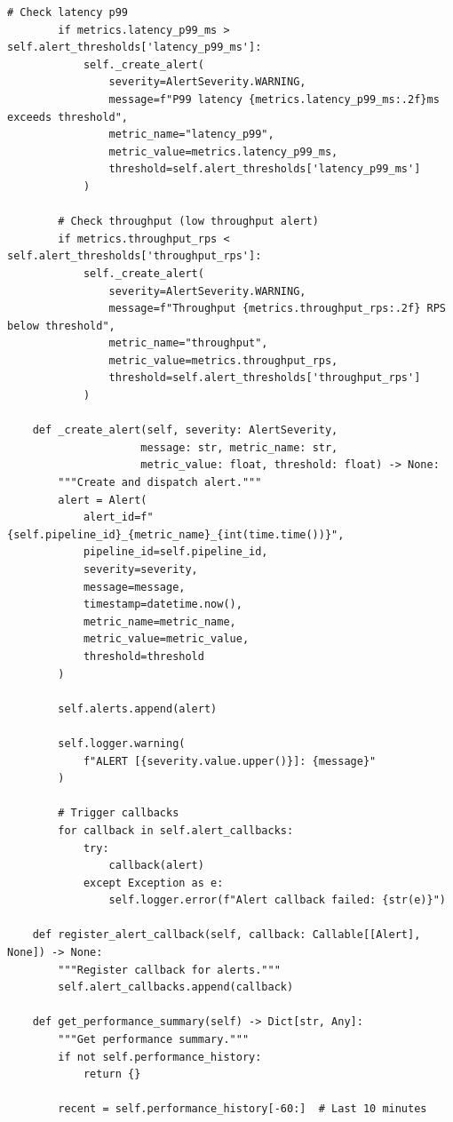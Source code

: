 \begin{lstlisting}[style=python, caption=PipelineMonitor with Performance Tracking]
        # Check latency p99
        if metrics.latency_p99_ms > self.alert_thresholds['latency_p99_ms']:
            self._create_alert(
                severity=AlertSeverity.WARNING,
                message=f"P99 latency {metrics.latency_p99_ms:.2f}ms exceeds threshold",
                metric_name="latency_p99",
                metric_value=metrics.latency_p99_ms,
                threshold=self.alert_thresholds['latency_p99_ms']
            )

        # Check throughput (low throughput alert)
        if metrics.throughput_rps < self.alert_thresholds['throughput_rps']:
            self._create_alert(
                severity=AlertSeverity.WARNING,
                message=f"Throughput {metrics.throughput_rps:.2f} RPS below threshold",
                metric_name="throughput",
                metric_value=metrics.throughput_rps,
                threshold=self.alert_thresholds['throughput_rps']
            )

    def _create_alert(self, severity: AlertSeverity,
                     message: str, metric_name: str,
                     metric_value: float, threshold: float) -> None:
        """Create and dispatch alert."""
        alert = Alert(
            alert_id=f"{self.pipeline_id}_{metric_name}_{int(time.time())}",
            pipeline_id=self.pipeline_id,
            severity=severity,
            message=message,
            timestamp=datetime.now(),
            metric_name=metric_name,
            metric_value=metric_value,
            threshold=threshold
        )

        self.alerts.append(alert)

        self.logger.warning(
            f"ALERT [{severity.value.upper()}]: {message}"
        )

        # Trigger callbacks
        for callback in self.alert_callbacks:
            try:
                callback(alert)
            except Exception as e:
                self.logger.error(f"Alert callback failed: {str(e)}")

    def register_alert_callback(self, callback: Callable[[Alert], None]) -> None:
        """Register callback for alerts."""
        self.alert_callbacks.append(callback)

    def get_performance_summary(self) -> Dict[str, Any]:
        """Get performance summary."""
        if not self.performance_history:
            return {}

        recent = self.performance_history[-60:]  # Last 10 minutes


\end{lstlisting}
